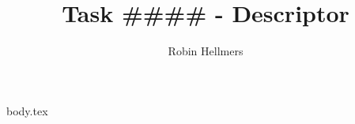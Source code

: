 \documentclass{article}
\title{Task  \#\#\#\# - Descriptor}
\author{Robin Hellmers}
\begin{document}
\maketitle
\newpage
{\hypersetup{hidelinks} \tableofcontents\label{toc}}
\newpage

{body.tex}
\end{document}
